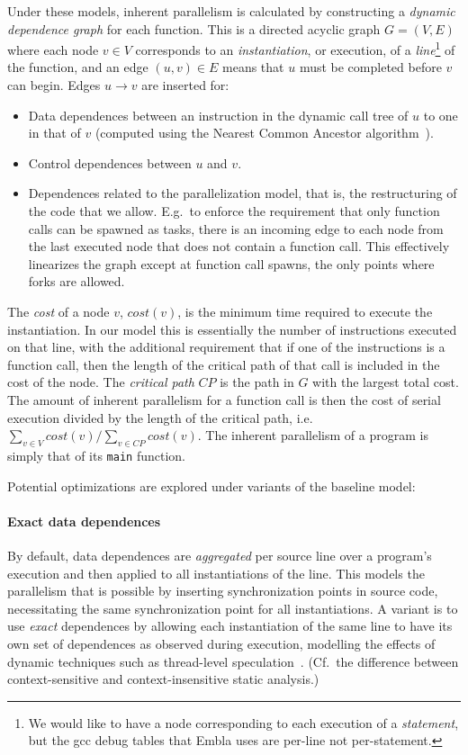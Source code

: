 Under these models, inherent parallelism is calculated by constructing a \emph{dynamic dependence graph} for each function.
This is a directed acyclic graph $G=(V,E)$ where each node $v\in V$ corresponds to an \emph{instantiation},
or execution, of a \emph{line}\footnote{We would like to have a node corresponding to each execution of a \emph{statement}, but the gcc debug tables that Embla uses are per-line not per-statement.} of the function,
and an edge $(u,v)\in E$ means that $u$ must be completed before $v$ can begin.
Edges $u \rightarrow v$ are inserted for:
\begin{itemize}
\item
Data dependences between an instruction in the dynamic call tree of $u$ to one in that of $v$ (computed using the Nearest Common Ancestor algorithm~\cite{embla:08}).
\item
Control dependences between $u$ and $v$.
\item
Dependences related to the parallelization model, that is, the restructuring of the code that we allow.
E.g.\ to enforce the requirement that only function calls can be spawned as tasks, there is an incoming edge to each node from the last executed node that does not contain a function call.
This effectively linearizes the graph except at function call spawns, the only points where forks are allowed.
\end{itemize} 
The \emph{cost} of a node $v$, $\mathit{cost}(v)$,
is the minimum time required to execute the instantiation.
In our model this is essentially the number of instructions executed on that line,
with the additional requirement that if one of the instructions is a function call,
then the length of the critical path of that call is included in the cost of the node.
The \emph{critical path} $\mathit{CP}$ is the path in $G$ with the largest total cost.
The amount of inherent parallelism for a function call is then the cost of serial execution divided by the length of the critical path,
i.e. $\sum_{v\in V} \mathit{cost}(v)/\sum_{v\in \mathit{CP}} \mathit{cost}(v)$.
The inherent parallelism of a program is simply that of its \texttt{main} function.

Potential optimizations are explored under variants of the baseline model:

\paragraph*{Exact data dependences}
By default, data dependences are \emph{aggregated} per source line over a program's execution
and then applied to all instantiations of the line.
This models the parallelism that is possible by inserting synchronization points in source code,
necessitating the same synchronization point for all instantiations.
A variant is to use \emph{exact} dependences by allowing each instantiation of the same line to have its own set of dependences as observed during execution,
modelling the effects of dynamic techniques such as thread-level speculation~\cite{Rundberg01anall-software,gregory05stampede}.
(Cf.\ the difference between context-sensitive and context-insensitive static analysis.)

